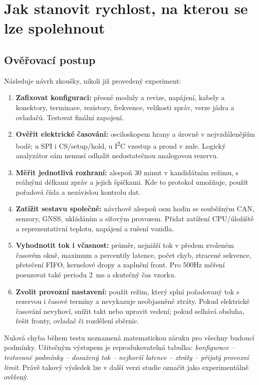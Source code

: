 \documentclass[11pt,a4paper]{article}
\begin{document}
\section{Jak stanovit rychlost, na kterou se lze spolehnout}
\subsection{Ověřovací postup}
Následuje návrh zkoušky, nikoli již provedený experiment:
\begin{enumerate}
\item \textbf{Zafixovat konfiguraci:} přesné moduly a revize, napájení, kabely a konektory, terminace, rezistory, frekvence, velikosti zpráv, verze jádra a ovladačů. Testovat finální zapojení.
\item \textbf{Ověřit elektrické časování:} osciloskopem hrany a úrovně v nejvzdálenějším bodě; u SPI i CS/setup/hold, u I\textsuperscript{2}C vzestup a proud v nule. Logický analyzátor sám nemusí odhalit nedostatečnou analogovou rezervu.
\item \textbf{Měřit jednotlivá rozhraní:} alespoň 30 minut v kandidátním režimu, s reálnými délkami zpráv a jejich špičkami. Kde to protokol umožňuje, použít pořadová čísla a nezávislou kontrolu dat.
\item \textbf{Zatížit sestavu společně:} návrhově alespoň osm hodin se souběžným CAN, senzory, GNSS, ukládáním a síťovým provozem. Přidat zatížení CPU/úložiště a reprezentativní teplotu, napájení a rušení vozidla.
\item \textbf{Vyhodnotit tok i včasnost:} průměr, nejnižší tok v předem zvoleném časovém okně, maximum a percentily latence, počet chyb, ztracené sekvence, přetečení FIFO, kernelové dropy a zaplnění front. Pro 500Hz měření posuzovat také periodu 2~ms a skutečný čas vzorku.
\item \textbf{Zvolit provozní nastavení:} použít režim, který splní požadovaný tok s rezervou i časové termíny a nevykazuje neobjasněné ztráty. Pokud elektrické časování nevyhoví, snížit takt nebo upravit vedení; pokud selhává obsluha, řešit fronty, ovladač či rozdělení sběrnic.
\end{enumerate}

Nulová chyba během testu neznamená matematickou záruku pro všechny budoucí podmínky. Užitečným výstupem je reprodukovatelná tabulka: \emph{konfigurace -- testované podmínky -- dosažený tok -- nejhorší latence -- ztráty -- přijatý provozní limit}. Právě takový výsledek lze v další verzi studie označit jako experimentálně ověřený.
\end{document}
